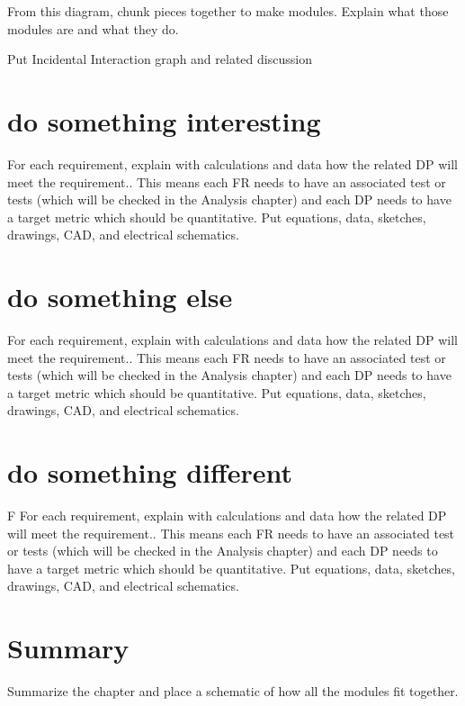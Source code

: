 From this diagram, chunk pieces together to make modules.
Explain what those modules are and what they do.

Put Incidental Interaction graph and related discussion

\section{ do something interesting}
For each requirement, explain with calculations and data how the related DP will meet the requirement..
This means each FR needs to have an associated test or tests (which will be checked in the Analysis chapter) and each DP needs to have a target metric which should be quantitative.
Put equations, data, sketches, drawings, CAD, and electrical schematics.

\section{ do something else}
For each requirement, explain with calculations and data how the related DP will meet the requirement..
This means each FR needs to have an associated test or tests (which will be checked in the Analysis chapter) and each DP needs to have a target metric which should be quantitative.
Put equations, data, sketches, drawings, CAD, and electrical schematics.


\section{ do something different}F
For each requirement, explain with calculations and data how the related DP will meet the requirement..
This means each FR needs to have an associated test or tests (which will be checked in the Analysis chapter) and each DP needs to have a target metric which should be quantitative.
Put equations, data, sketches, drawings, CAD, and electrical schematics.

\section{Summary}
Summarize the chapter and place a schematic of how all the modules fit together.

